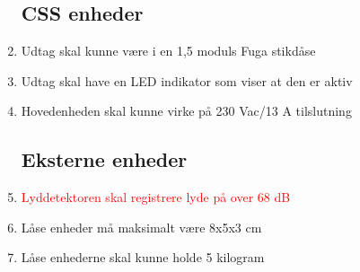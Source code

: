 \begin{enumerate}
	\subsection*{CSS enheder}
	\item Udtag skal kunne være i en 1,5 moduls Fuga stikdåse
	\item Udtag skal have en LED indikator som viser at den er aktiv
	\item Hovedenheden skal kunne virke på 230 Vac/13 A tilslutning

	\subsection*{Eksterne enheder}
	\item \textcolor{red}{Lyddetektoren skal registrere lyde på over 68 dB}
	\item Låse enheder må maksimalt være 8x5x3 cm
	\item Låse enhederne skal kunne holde 5 kilogram

\end{enumerate}
